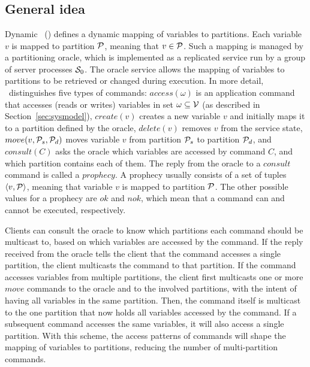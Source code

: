 \section{\dssmrlong}
\subsection{General idea}
\label{sec:dssmr-idea}

Dynamic \ssmr\ (\dssmr) defines a dynamic mapping of variables to partitions.
Each variable $v$ is mapped to partition $\mathcal{P}$, meaning that $v \in \mathcal{P}$. Such
a mapping is managed by a partitioning oracle, which is implemented as a
replicated service run by a group of server processes $\mathcal{S}_0$. The oracle
service allows the mapping of variables to partitions to be retrieved or changed
during execution. In more detail, \dssmr\ distinguishes five types of commands:
$access(\omega)$ is an application command that accesses (reads or writes)
variables in set $\omega \subseteq \mathcal{V}$ (as described in
Section~\ref{sec:sysmodel}), $create(v)$ creates a new variable $v$ and
initially maps it to a partition defined by the oracle, $delete(v)$ removes $v$
from the service state,
$move(v,\mathcal{P}_s,\mathcal{P}_d)$ moves variable $v$ from partition $\mathcal{P}_s$ to partition
$\mathcal{P}_d$, and $consult(C)$ asks the oracle which variables are accessed by
command $C$, and which partition contains each of them. The reply from the
oracle to a $consult$ command is called a $prophecy$. A prophecy usually
consists of a set of tuples $\langle v, \mathcal{P} \rangle$, meaning that variable $v$
is mapped to partition $\mathcal{P}$. The other possible values for a prophecy are $ok$
and $nok$, which mean that a command can and cannot be executed, respectively.

Clients can consult the oracle to know which partitions each command should be
multicast to, based on which variables are accessed by the command. If the reply
received from the oracle tells the client that the command accesses a single
partition, the client multicasts the command to that partition. If the command
accesses variables from multiple partitions, the client first multicasts one or
more $move$ commands to the oracle and to the involved partitions, with the
intent of having all variables in the same partition. Then, the command itself
is multicast to the one partition that now holds all variables accessed by the
command. If a subsequent command accesses the same variables, it will also
access a single partition. With this scheme, the access patterns of commands
will shape the mapping of variables to partitions, reducing the number of
multi-partition commands.


